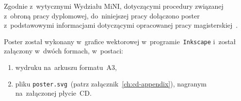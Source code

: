 \documentclass[thesis]{subfiles}
\begin{document}
\begin{appendices}
Zgodnie z~wytycznymi Wydziału MiNI, dotyczącymi procedury związanej z~obroną pracy dyplomowej, do~niniejszej pracy dołączono poster z~podstawowymi informacjami dotyczącymi opracowanej pracy magisterskiej~\cite{informacje-dot-obron}.

Poster został wykonany w~grafice wektorowej w~programie~\texttt{Inkscape} i~został załączony w~dwóch formach, w~postaci:
\begin{enumerate}
	\item wydruku na~arkuszu formatu~A3,
	\item pliku \mbox{\texttt{poster.svg}}~(patrz załącznik~\ref{ch:cd-appendix}), nagranym na~załączonej płycie~CD.
\end{enumerate}



%


\end{appendices}
\end{document}
